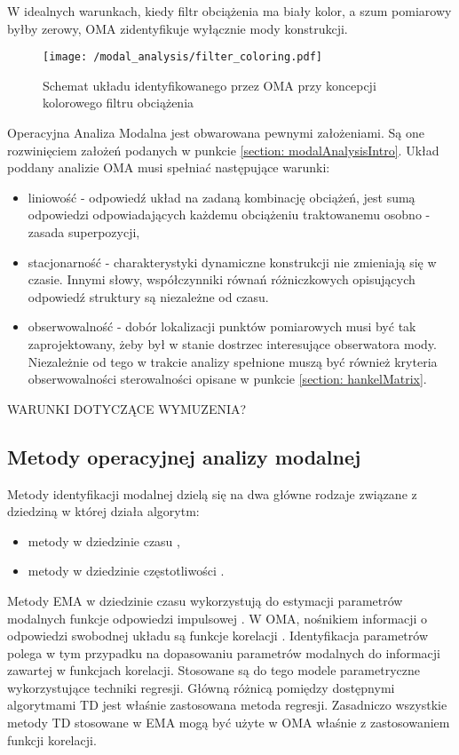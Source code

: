 W idealnych warunkach, kiedy filtr obciążenia ma biały kolor, a szum pomiarowy byłby zerowy, OMA zidentyfikuje wyłącznie mody konstrukcji.
\begin{figure}[h] 
	\centering
	\texttt{[image: /modal\_analysis/filter\_coloring.pdf]}
	\captionsetup{justification=centering}
	\caption{Schemat układu identyfikowanego przez OMA przy koncepcji kolorowego filtru obciążenia}
	\label{fig: color_filter_oma}
\end{figure}

Operacyjna Analiza Modalna jest obwarowana pewnymi założeniami. Są one rozwinięciem założeń podanych w punkcie \ref{section: modalAnalysisIntro}. Układ poddany analizie OMA musi spełniać następujące warunki:
\begin{itemize}
	\item liniowość - odpowiedź układ na zadaną kombinację obciążeń, jest sumą odpowiedzi odpowiadających każdemu obciążeniu traktowanemu osobno - zasada superpozycji,
	\item stacjonarność - charakterystyki dynamiczne konstrukcji nie zmieniają się w czasie. Innymi słowy, współczynniki równań różniczkowych opisujących odpowiedź struktury są niezależne od czasu.
	\item obserwowalność - dobór lokalizacji punktów pomiarowych musi być tak zaprojektowany, żeby był w stanie dostrzec interesujące obserwatora mody. Niezależnie od tego w trakcie analizy spełnione muszą być również kryteria obserwowalności sterowalności opisane w punkcie \ref{section: hankelMatrix}.
\end{itemize}


WARUNKI DOTYCZĄCE WYMUZENIA? \cite{Rainieri2014}

\subsection{Metody operacyjnej analizy modalnej}

Metody identyfikacji modalnej dzielą się na dwa główne rodzaje związane z dziedziną w której działa algorytm:
\begin{itemize}[noitemsep]
	\item metody w dziedzinie czasu ,
	\item metody w dziedzinie częstotliwości .
\end{itemize}
Metody EMA w dziedzinie czasu wykorzystują do estymacji parametrów modalnych funkcje odpowiedzi impulsowej . W OMA, nośnikiem informacji o odpowiedzi swobodnej układu  są funkcje korelacji . Identyfikacja parametrów polega w tym przypadku na dopasowaniu parametrów modalnych do informacji zawartej w funkcjach korelacji. Stosowane są do tego modele parametryczne wykorzystujące techniki regresji. Główną różnicą pomiędzy dostępnymi algorytmami TD jest właśnie zastosowana metoda regresji. Zasadniczo wszystkie metody TD stosowane w EMA mogą być użyte w OMA właśnie z zastosowaniem funkcji korelacji. 


